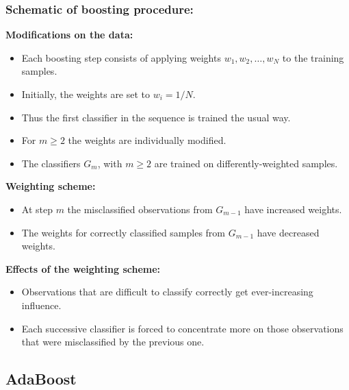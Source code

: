 \subsubsection{Schematic of boosting procedure:}

 \textbf{Modifications on the data:}

  \begin{itemize}
    \item Each boosting step consists of applying weights $w_1, w_2, \ldots, w_N$ to the training samples.
    \item Initially, the weights are set to $w_i = 1/N$.
    \item Thus the first classifier in the sequence is trained the usual way. %
    \item For $m \geq 2$ the weights are individually modified. %
    \item The classifiers $G_m$, with $m \geq 2$ are trained on differently-weighted samples.
  \end{itemize}
 
 \textbf {Weighting scheme:}
  \begin{itemize}
    \item At step $m$ the misclassified observations from $G_{m-1}$ have increased weights.
    \item The weights for correctly classified samples from $G_{m-1}$ have decreased weights.
  \end{itemize}
         

 \textbf {Effects of the weighting scheme:}
  \begin{itemize}
    \item Observations that are difficult to classify correctly get ever-increasing influence.
    \item Each successive classifier is forced to concentrate more on those observations that were misclassified by the previous one.
  \end{itemize}
 
\subsection{AdaBoost}


